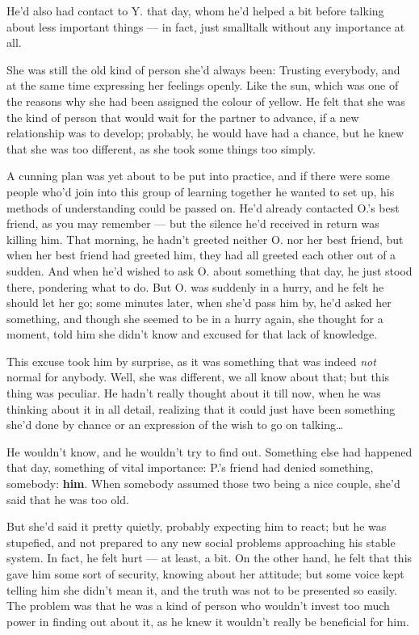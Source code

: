 He'd also had contact to Y. that day, whom he'd helped a bit before talking about less important things --- in fact, just smalltalk without any importance at all.

She was still the old kind of person she'd always been: Trusting everybody, and at the same time expressing her feelings openly. Like the sun, which was one of the reasons why she had been assigned the colour of yellow. He felt that she was the kind of person that would wait for the partner to advance, if a new relationship was to develop; probably, he would have had a chance, but he knew that she was too different, as she took some things too simply.

A cunning plan was yet about to be put into practice, and if there were some people who'd join into this group of learning together he wanted to set up, his methods of understanding could be passed on. He'd already contacted O.'s best friend, as you may remember --- but the silence he'd received in return was killing him. That morning, he hadn't greeted neither O. nor her best friend, but when her best friend had greeted him, they had all greeted each other out of a sudden. And when he'd wished to ask O. about something that day, he just stood there, pondering what to do. But O. was suddenly in a hurry, and he felt he should let her go; some minutes later, when she'd pass him by, he'd asked her something, and though she seemed to be in a hurry again, she thought for a moment, told him she didn't know and excused for that lack of knowledge.

This excuse took him by surprise, as it was something that was indeed \emph{not} normal for anybody. Well, she was different, we all know about that; but this thing was peculiar. He hadn't really thought about it till now, when he was thinking about it in all detail, realizing that it could just have been something she'd done by chance or an expression of the wish to go on talking\ldots

He wouldn't know, and he wouldn't try to find out. Something else had happened that day, something of vital importance: 
P.'s friend had denied something, somebody: \textbf{him}. When somebody assumed those two being a nice couple, she'd said that he was too old.

But she'd said it pretty quietly, probably expecting him to react; but he was stupefied, and not prepared to any new social problems approaching his stable system. In fact, he felt hurt --- at least, a bit. On the other hand, he felt that this gave him some sort of security, knowing about her attitude; but some voice kept telling him she didn't mean it, and the truth was not to be presented so easily. The problem was that he was a kind of person who wouldn't invest too much power in finding out about it, as he knew it wouldn't really be beneficial for him.

